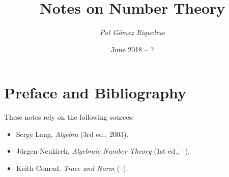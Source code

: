 \documentclass[12pt,oneside]{article}
\begin{document}
\title{Notes on Number Theory}
\author{\small\textit{Pol Gómez Riquelme}}
\date{June 2018 -- ?}
\maketitle

\tableofcontents
\pagebreak

\section*{Preface and Bibliography}

These notes rely on the following sources:
\begin{itemize}
	\item Serge Lang, \emph{Algebra} (3rd ed., 2003).
	\item Jürgen Neukirch, \emph{Algebraic Number Theory} (1st ed., --).
	\item Keith Conrad, \emph{Trace and Norm} (--).
\end{itemize}

\pagebreak



\end{document}
